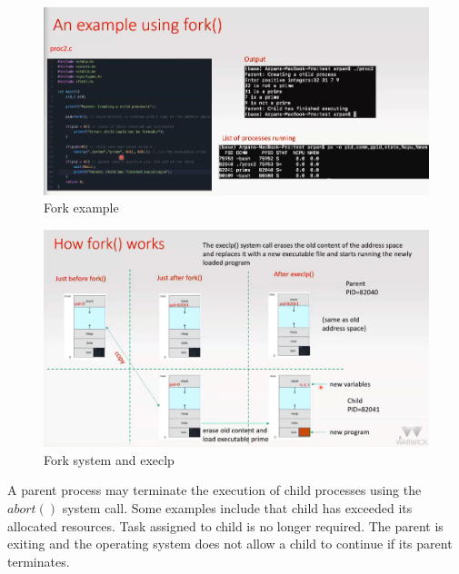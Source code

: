 \documentclass[a4paper]{article}
\theoremstyle{plain}
\theoremstyle{definition}
\newtheorem{defn}{Definition}[section]
\newtheorem{exmp}{Example}[section]
\theoremstyle{remark}
\begin{document}
\begin{tcolorbox}[colback=black!3!white,colframe=black!60!white,title=\begin{exmp}Fork() \label{Fork()}\end{exmp}]
\begin{figure}[H]
	\centering
	\includegraphics[width=1\textwidth]{eight.png}
	\caption{Fork example}
	\label{fig:eight-png}
\end{figure}
\begin{figure}[H]
	\centering
	\includegraphics[width=1\textwidth]{nine.png}
	\caption{Fork system and execlp}
	\label{fig:ninenine-pngpng}
\end{figure}
\end{tcolorbox}
\begin{tcolorbox}[colback=black!3!white,colframe=black!60!white,title=\begin{defn}Process Termination \label{Process Termination}\end{defn}]
A parent process may terminate the execution of child processes using the $abort\left(  \right) $ system call. Some examples include that child has exceeded its allocated resources. Task assigned to child is no longer required. The parent is exiting and the operating system does not allow a child to continue if its parent terminates.
\end{tcolorbox}
\end{document}
